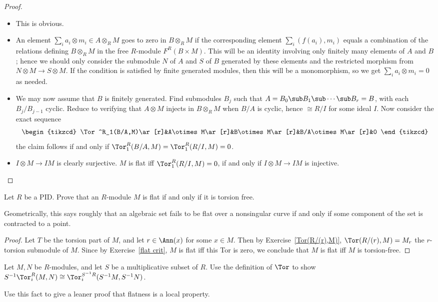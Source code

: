 \begin{proof}
\mbox{}
\begin{itemize}
\item This is obvious.
\item An element $\sum_ia_i\otimes m_i\in A\otimes_{R}M$ goes to zero in $B\otimes_{R}M$ if the
corresponding element $\sum_i(f(a_i),m_i)$ equals a combination of the relations defining $B\otimes_{R}M$ in the free $R$-module $F^R(B\times M)$. This will be an identity involving only finitely many elements of $A$ and $B$; hence we should only consider the submodule $N$ of $A$ and $S$ of $B$ generated by these elements and the restricted morphism from $N\otimes M\to S\otimes M$. If the condition is satisfied by finite generated modules, then this will be a monomorphism, so we get $\sum_ia_i\otimes m_i=0$ as needed.
\item We may now assume that $B$ is finitely generated. Find submodules $B_j$ such that $A=B_0\sub B_1\sub\cdots\sub B_r=B$, with each $B_j/B_{j-1}$ cyclic. Reduce to verifying that $A\otimes M$ injects in $B\otimes_{R} M$ when $B/A$ is cyclic, hence $\cong R/I$ for some ideal $I$. Now consider the exact sequence
\[\begin{tikzcd}
\Tor^R_1(B/A,M)\ar[r]&A\otimes M\ar[r]&B\otimes M\ar[r]&B/A\otimes M\ar[r]&0
\end{tikzcd}\]
the claim follows if and only if $\Tor^R_1(B/A,M)=\Tor^R_1(R/I,M)=0$.
\item $I\otimes M\to IM$ is clearly surjective. $M$ is flat iff $\Tor^R_1(R/I,M)=0$, if and only if $I\otimes M\to IM$ is injective.
\end{itemize}
\end{proof}
\begin{exercise}\label{PID flat iff torsion}
Let $R$ be a PID. Prove that an $R$-module $M$ is flat if and only if it is torsion free.\par
Geometrically, this says roughly that an algebraic set fails to be flat over a nonsingular curve if and only if some component of the set is contracted to a point.
\end{exercise}
\begin{proof}
Let $T$ be the torsion part of $M$, and let $r\in\Ann(x)$ for some $x\in M$. Then by Exercise~\ref{Tor(R/(r),M)}, $\Tor(R/(r),M)=M_r$ the $r$-torsion submodule of $M$. Since by Exercise~\ref{flat crit}, $M$ is flat iff this Tor is zero, we conclude that $M$ is flat iff $M$ is torsion-free.
\end{proof}
\begin{exercise}\label{local Tor}
Let $M,N$ be $R$-modules, and let $S$ be a multiplicative subset of $R$. Use the definition of $\Tor$ to show $S^{-1}\Tor^R_i(M,N)\cong\Tor^{S^{-1}R}_i(S^{-1}M,S^{-1}N)$.\par
Use this fact to give a leaner proof that flatness is a local property.
\end{exercise}
